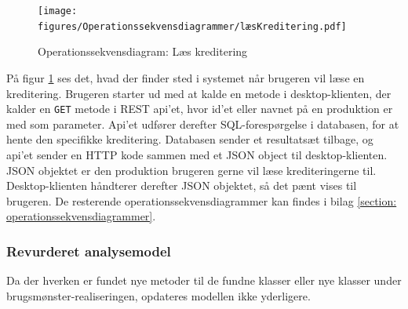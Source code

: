 \begin{figure}[H] %
\centering
\texttt{[image: figures/Operationssekvensdiagrammer/læsKreditering.pdf]}
\caption{Operationssekvensdiagram: Læs kreditering}
\label{fig:op_read_credit}
\end{figure}

\noindent
På figur \ref{fig:op_read_credit} ses det, hvad der finder sted i systemet når brugeren vil læse en kreditering. Brugeren starter ud med at kalde en metode i desktop-klienten, der kalder en \texttt{GET} metode i REST api'et, hvor id'et eller navnet på en produktion er med som parameter. Api'et udfører derefter SQL-forespørgelse i databasen, for at hente den specifikke kreditering. Databasen sender et resultatsæt tilbage, og api'et sender en HTTP kode sammen med et JSON object til desktop-klienten. JSON objektet er den produktion brugeren gerne vil læse krediteringerne til. Desktop-klienten håndterer derefter JSON objektet, så det pænt vises til brugeren. De resterende operationssekvensdiagrammer kan findes i bilag \ref{section: operationssekvensdiagrammer}.


\subsubsection{Revurderet analysemodel}
Da der hverken er fundet nye metoder til de fundne klasser eller nye klasser under brugsmønster-realiseringen, opdateres modellen ikke yderligere. \\





